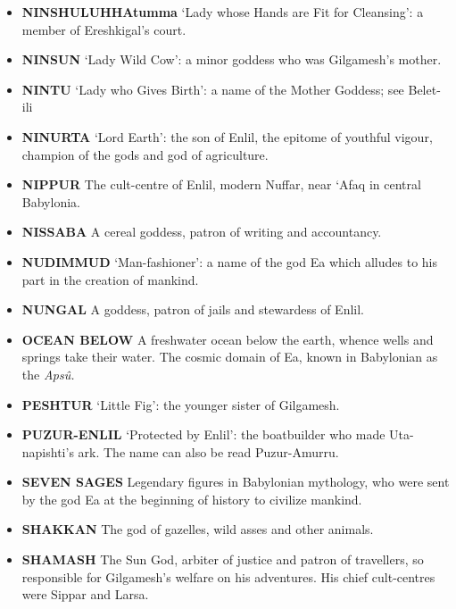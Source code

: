 \documentclass{article}
\begin{document}
\begin{multicols}{3}
\begin{small}
\begin{itemize}[
        label=,
        leftmargin=1.0em,
        itemindent=-1.0em,
        nosep,
    ]
    \item \textbf{NINSHULUHHAtumma}
    `Lady whose Hands are Fit for Cleansing': a member of Ereshkigal's
    court.

    \item \textbf{NINSUN}
    `Lady Wild Cow': a minor goddess who was Gilgamesh's mother.

    \item \textbf{NINTU}
    `Lady who Gives Birth': a name of the Mother Goddess; see Belet-ili

    \item \textbf{NINURTA}
    `Lord Earth': the son of Enlil, the epitome of youthful vigour, champion
    of the gods and god of agriculture.

    \item \textbf{NIPPUR}
    The cult-centre of Enlil, modern Nuffar, near `Afaq in central
    Babylonia.

    \item \textbf{NISSABA}
    A cereal goddess,
    patron of writing and accountancy.

    \item \textbf{NUDIMMUD}
    `Man-fashioner': a name of the god Ea which alludes to his part in the
    creation of mankind.

    \item \textbf{NUNGAL}
    A goddess, patron of jails and stewardess of Enlil.

    \item \textbf{OCEAN BELOW} A freshwater ocean below the earth, whence wells and springs
    take their water. The cosmic domain of Ea, known in Babylonian as the
    \emph{Apsû.}

    \item \textbf{PESHTUR}
    `Little Fig': the younger sister of Gilgamesh.

    \item \textbf{PUZUR-ENLIL}
    `Protected by Enlil': the boatbuilder who made Uta-napishti's ark. The
    name can also be read Puzur-Amurru.

    \item \textbf{SEVEN SAGES} Legendary figures in Babylonian mythology, who were sent by the
    god Ea at the beginning of history to civilize mankind.

    \item \textbf{SHAKKAN}
    The god of gazelles, wild asses and other animals.

    \item \textbf{SHAMASH}
    The Sun God, arbiter of justice and patron of travellers, so responsible
    for Gilgamesh's welfare on his adventures. His chief cult-centres were
    Sippar and Larsa.


\end{itemize}
\end{small}
\end{multicols}
\end{document}
